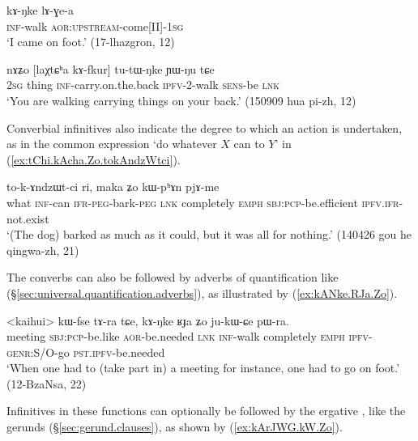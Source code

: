 \begin{exe}
\ex \label{ex:kANke.lAGea}
\gll  kɤ-ŋke lɤ-ɣe-a \\
\textsc{inf}-walk  \textsc{aor}:\textsc{upstream}-come[II]-\textsc{1sg} \\
\glt `I came on foot.' (17-lhazgron, 12)
\end{exe}

\begin{exe}
\ex \label{ex:kAfkur.tutWNke}
\gll nɤʑo [laχtɕʰa kɤ-fkur] tu-tɯ-ŋke ɲɯ-ŋu tɕe \\
\textsc{2sg} thing \textsc{inf}-carry.on.the.back \textsc{ipfv}-2-walk \textsc{sens}-be \textsc{lnk} \\
\glt `You are walking carrying things on your back.' (150909 hua pi-zh, 12)
\end{exe}

Converbial infinitives also indicate the degree to which an action is undertaken, as in the common expression  `do whatever $X$ can to $Y$' in (\ref{ex:tChi.kAcha.Zo.tokAndzWtci}).

\begin{exe}
\ex \label{ex:tChi.kAcha.Zo.tokAndzWtci}
 to-k-ɤndzɯt-ci ri, maka ʑo kɯ-pʰɤn pjɤ-me \\
what \textsc{inf}-can  \textsc{ifr}-\textsc{peg}-bark-\textsc{peg}  \textsc{lnk} completely \textsc{emph} \textsc{sbj}:\textsc{pcp}-be.efficient \textsc{ipfv}.\textsc{ifr}-not.exist \\
\glt `(The dog) barked as much as it could, but it was all for nothing.'  (140426 gou he qingwa-zh, 21)
\end{exe}

The converbs can also be followed by adverbs of quantification like  (§\ref{sec:universal.quantification.adverbs}), as illustrated by (\ref{ex:kANke.RJa.Zo}).

\begin{exe}
\ex \label{ex:kANke.RJa.Zo}
\gll <kaihui> kɯ-fse tɤ-ra tɕe, kɤ-ŋke ʁɟa ʑo ju-kɯ-ɕe pɯ-ra. \\
meeting \textsc{sbj}:\textsc{pcp}-be.like \textsc{aor}-be.needed \textsc{lnk} \textsc{inf}-walk completely \textsc{emph} \textsc{ipfv}-\textsc{genr}:S/O-go \textsc{pst}.\textsc{ipfv}-be.needed \\
\glt `When one had to (take part in) a meeting for instance, one had to go on foot.' (12-BzaNsa, 22)
\end{exe}

Infinitives in these functions can optionally be followed by the ergative , like the gerunds (§\ref{sec:gerund.clauses}), as shown by (\ref{ex:kArJWG.kW.Zo}). 

